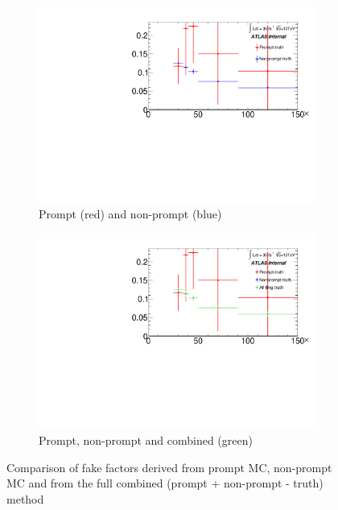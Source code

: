 \documentclass[11pt]{article}
\begin{document}
	\begin{figure}[H]
	\centering
	\begin{subfigure}{.5\textwidth}
	\centering
	\includegraphics[width=1.\linewidth]{figures/FakesEstimate_data_pp8_nonallhad_new_SubtractionFix_newOverlay/Overlay_FF_CompareFF_prompt_nonprompt.pdf}
  	\caption{Prompt (red) and non-prompt (blue)  }
  	\label{fig:sub1}
	\end{subfigure}%
	\begin{subfigure}{.5\textwidth}
	\centering
	\includegraphics[width=1.\linewidth]{figures/FakesEstimate_data_pp8_nonallhad_new_SubtractionFix_newOverlay/Overlay_FF_CompareFF_all.pdf}
	\caption{Prompt, non-prompt and combined (green) }
	\end{subfigure}
	\caption{Comparison of fake factors derived from prompt MC, non-prompt MC and from the full combined (prompt + non-prompt - truth) method}
	\end{figure}
	
\end{document}
